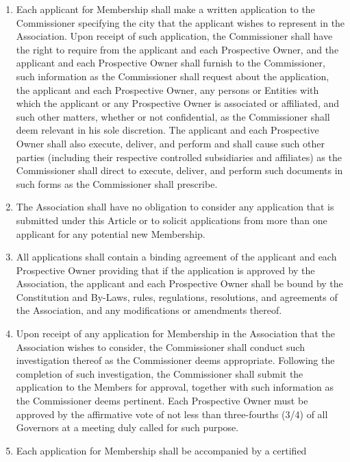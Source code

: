 \documentclass[]{book}
\providecommand{\tightlist}{%
  \setlength{\itemsep}{0pt}\setlength{\parskip}{0pt}}
\theoremstyle{definition}
\theoremstyle{definition}
\theoremstyle{definition}
\theoremstyle{remark}
\begin{document}
\begin{enumerate}
\def\labelenumi{(\alph{enumi})}
\tightlist
\item
  Each applicant for Membership shall make a written application to the
  Commissioner specifying the city that the applicant wishes to
  represent in the Association. Upon receipt of such application, the
  Commissioner shall have the right to require from the applicant and
  each Prospective Owner, and the applicant and each Prospective Owner
  shall furnish to the Commissioner, such information as the
  Commissioner shall request about the application, the applicant and
  each Prospective Owner, any persons or Entities with which the
  applicant or any Prospective Owner is associated or affiliated, and
  such other matters, whether or not confidential, as the Commissioner
  shall deem relevant in his sole discretion. The applicant and each
  Prospective Owner shall also execute, deliver, and perform and shall
  cause such other parties (including their respective controlled
  subsidiaries and affiliates) as the Commissioner shall direct to
  execute, deliver, and perform such documents in such forms as the
  Commissioner shall prescribe.
\item
  The Association shall have no obligation to consider any application
  that is submitted under this Article or to solicit applications from
  more than one applicant for any potential new Membership.
\item
  All applications shall contain a binding agreement of the applicant
  and each Prospective Owner providing that if the application is
  approved by the Association, the applicant and each Prospective Owner
  shall be bound by the Constitution and By-Laws, rules, regulations,
  resolutions, and agreements of the Association, and any modifications
  or amendments thereof.
\item
  Upon receipt of any application for Membership in the Association that
  the Association wishes to consider, the Commissioner shall conduct
  such investigation thereof as the Commissioner deems appropriate.
  Following the completion of such investigation, the Commissioner shall
  submit the application to the Members for approval, together with such
  information as the Commissioner deems pertinent. Each Prospective
  Owner must be approved by the affirmative vote of not less than
  three-fourths (3/4) of all Governors at a meeting duly called for such
  purpose.
\item
  Each application for Membership shall be accompanied by a certified

\end{enumerate}
\end{document}
